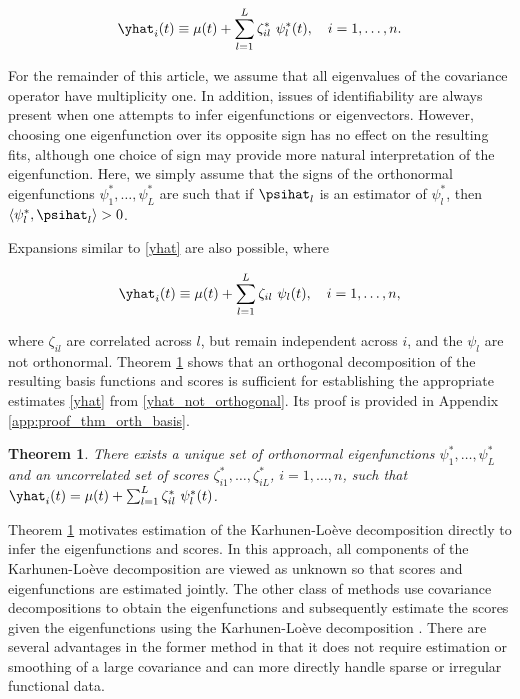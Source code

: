 \documentclass[ba]{imsart}
\numberwithin{equation}{section}
\theoremstyle{plain}
\newtheorem{thm}{Theorem}[section]
\begin{document}
\begin{equation}
	\yhat_i (t) \equiv \mu (t) + \sum_{l=1}^L \zeta^*_{il} \ \psi^*_l (t), \quad i = 1, \dots, n.
\label{yhat}
\end{equation}

For the remainder of this article, we assume that all eigenvalues of the covariance operator have multiplicity one.
In addition, issues of identifiability are always present when one attempts to infer eigenfunctions or eigenvectors.
However, choosing one eigenfunction over its opposite sign has no effect on the resulting fits, although one choice
of sign may provide more natural interpretation of the eigenfunction. Here, we simply assume that
the signs of the orthonormal eigenfunctions $\psi^*_1, \dots, \psi^*_L$ are such that if $\psihat_l$ is an
estimator of $\psi^*_l$, then $\langle \psi^*_l , \psihat_l \rangle > 0$.

Expansions similar to \eqref{yhat} are also possible, where

\begin{equation}
	\yhat_i (t) \equiv \mu (t) + \sum_{l=1}^L \zeta_{il} \ \psi_l (t), \quad i = 1, \dots, n,
\label{yhat_not_orthogonal}
\end{equation}

\noindent where $\zeta_{il}$ are correlated across $l$, but remain independent across $i$, and the $\psi_l$ are not
orthonormal. Theorem \ref{thm:orth_basis} shows that an orthogonal decomposition of the resulting basis functions
and scores is sufficient for establishing the appropriate estimates \eqref{yhat} from \eqref{yhat_not_orthogonal}.
Its proof is provided in Appendix \ref{app:proof_thm_orth_basis}.

\begin{thm}
	
	There exists a unique set of orthonormal
	eigenfunctions $\psi^*_1, \dots, \psi^*_L$ and an uncorrelated set of scores $\zeta^*_{i1}, \dots, \zeta^*_{iL}$,
	$i = 1, \dots, n$, such that $\yhat_i (t) = \mu (t) + \sum_{l=1}^L \zeta^*_{il} \ \psi^*_l (t)$.
	
\label{thm:orth_basis}
\end{thm}

Theorem \ref{thm:orth_basis} motivates estimation of the Karhunen-Lo\`{e}ve decomposition directly to infer
the eigenfunctions and scores. In this approach, all components of the Karhunen-Lo\`{e}ve decomposition are
viewed as unknown so that scores and eigenfunctions are estimated jointly.
The other class of methods use covariance decompositions to obtain the eigenfunctions
and subsequently estimate the scores given the eigenfunctions using the Karhunen-Lo\`{e}ve decomposition
\citep[e.g.][]{yao05, di09, xiao16}. There are several advantages in the former method in that it does not require
estimation or smoothing of a large covariance and can more directly handle sparse or irregular functional data.
\end{document}
